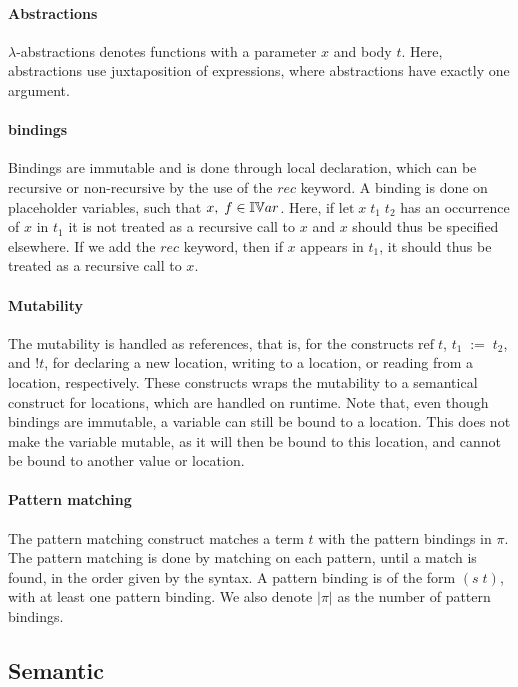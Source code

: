 \documentclass[../../master.tex]{subfiles}
\begin{document}
\paragraph{Abstractions}
$\lambda$-abstractions denotes functions with a parameter $x$ and body $t$.
Here, abstractions use juxtaposition of expressions, where abstractions have exactly one argument.

\paragraph{bindings}
Bindings are immutable and is done through local declaration, which can be recursive or non-recursive by the use of the $rec$ keyword.
A binding is done on placeholder variables, such that $x,\;f\in\mathbb{IV}ar$.
Here, if $\mbox{let}\;x\;t_1\;t_2$ has an occurrence of $x$ in $t_1$ it is not treated as a recursive call to $x$ and $x$ should thus be specified elsewhere.
If we add the $rec$ keyword, then if $x$ appears in $t_1$, it should thus be treated as a recursive call to $x$.

\paragraph{Mutability}
The mutability is handled as references, that is, for the constructs $\mbox{ref}\;t$, $t_1\;:=\;t_2$, and $!t$, for declaring a new location, writing to a location, or reading from a location, respectively.
These constructs wraps the mutability to a semantical construct for locations, which are handled on runtime.
Note that, even though bindings are immutable, a variable can still be bound to a location.
This does not make the variable mutable, as it will then be bound to this location, and cannot be bound to another value or location.

\paragraph{Pattern matching}
The pattern matching construct matches a term $t$ with the pattern bindings in $\pi$.
The pattern matching is done by matching on each pattern, until a match is found, in the order given by the syntax.
A pattern binding is of the form $(s\;t)$, with at least one pattern binding.
We also denote $|\pi|$ as the number of pattern bindings.

\subsection{Semantic}
\end{document}
